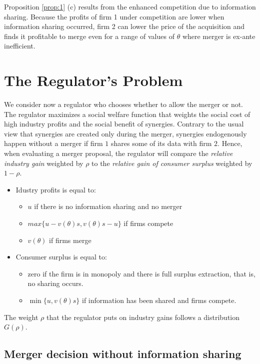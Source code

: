 \documentclass[a4paper,leqno]{article}%
\renewcommand{\t}{\theta}
\begin{document}
\medskip

Proposition \ref{prop:1} (c) results from the enhanced competition due to information sharing. Because the profits of firm 1 under competition are lower when information sharing occurred, firm 2 can lower the price of the acquisition and finds it profitable to merge even for a range of values of $\t$ where merger is ex-ante inefficient.

\medskip

\section{The Regulator's Problem}

We consider now a regulator who chooses whether to allow the merger or not. The regulator maximizes a social welfare function that weights the social cost of high industry profits and the social benefit of synergies. Contrary to the usual view that synergies are created only during the merger, synergies endogenously happen without a merger if firm $1$ shares some of its data with firm $2$. Hence, when evaluating a merger proposal, the regulator will compare the \emph{relative industry gain} weighted by $\rho$ to the \emph{relative gain of consumer surplus} weighted by $1-\rho$.


\begin{itemize}
    \item Idustry profits is equal to:
    \begin{itemize}
        \item $u$ if there is no information sharing and no merger
        \item $max\{u-v(\t)s,v(\t)s-u\}$ if firms compete
        \item $v(\t)$ if firms merge
    \end{itemize}
    \item Consumer surplus is equal to:
    \begin{itemize}
        \item zero if the firm is in monopoly and there is full surplus extraction, that is, no sharing occurs.
        \item $\min\{u,v(\t)s\}$ if information has been shared and firms compete.
    \end{itemize}
\end{itemize}

The weight $\rho$ that the regulator puts on industry gains follows a distribution $G(\rho)$.


\subsection{Merger decision without information sharing}
\end{document}
